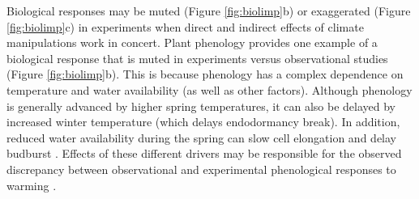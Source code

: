 \documentclass{article}
\begin{document}
\par Biological responses may be muted  (Figure \ref{fig:biolimp}b) or exaggerated  (Figure \ref{fig:biolimp}c) in experiments when direct and indirect effects of climate manipulations work in concert. Plant phenology provides one example of a biological response that is muted in experiments versus observational studies (Figure \ref{fig:biolimp}b). This is because phenology has a complex dependence on temperature and water availability (as well as other factors). Although phenology is generally advanced by higher spring temperatures, it can also be delayed by increased winter temperature (which delays endodormancy break). In addition, reduced water availability during the spring can slow cell elongation and delay budburst \citep{penuelas2004,ourcival2011,craine2012,matthews2016}. Effects of these different drivers may be responsible for the observed discrepancy between observational and experimental phenological responses to warming \citep{wolkovich2012}. 
\end{document}
